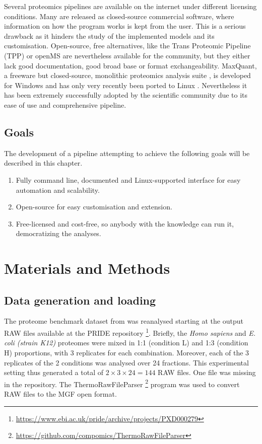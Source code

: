 Several proteomics pipelines are available on the internet under different licensing conditions. Many are released as closed-source commercial software, where information on how the program works is kept from the user. This is a serious drawback as it hinders the study of the implemented models and its customisation. Open-source, free alternatives, like the Trans Proteomic Pipeline (\ac{TPP}) \cite{Deutsch2011} or openMS \cite{Sturm2008} are nevertheless available for the community, but they either lack good documentation, good broad base or format exchangeability. MaxQuant, a freeware but closed-source, monolithic proteomics analysis suite \cite{Cox2008}, is developed for Windows and has only very recently been ported to Linux \cite{Sinitcyn2018}. Nevertheless it has been extremely successfully adopted by the scientific community due to its ease of use and comprehensive pipeline.

\subsection{Goals}

The development of a pipeline attempting to achieve the following goals will be described in this chapter.

\begin{enumerate}

\item Fully command line, documented and Linux-supported interface for easy automation and scalability.
\item Open-source for easy customisation and extension.
\item Free-licensed and cost-free, so anybody with the knowledge can run it, democratizing the analyses.
\end{enumerate}

\section{Materials and Methods}

\subsection{Data generation and loading}

The proteome benchmark dataset from \cite{Cox2014} was reanalysed starting at the output RAW files available at the PRIDE repository \footnote{\href{https://www.ebi.ac.uk/pride/archive/projects/PXD000279}{https://www.ebi.ac.uk/pride/archive/projects/PXD000279}}. Briefly, the \textit{Homo sapiens} and \textit{E. coli (strain K12)} proteomes were mixed in 1:1 (condition L) and 1:3 (condition H) proportions, with 3 replicates for each combination. Moreover, each of the 3 replicates of the 2 conditions was analysed over 24 fractions. This experimental setting thus generated a total of $2 \times 3 \times 24=144$ RAW files. One file was missing in the repository. The ThermoRawFileParser \footnote{\href{https://github.com/compomics/ThermoRawFileParser}{https://github.com/compomics/ThermoRawFileParser}} program was used to convert RAW files to the MGF open format.

